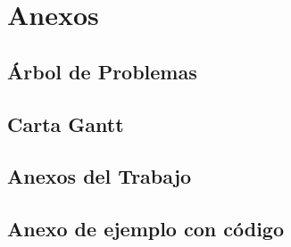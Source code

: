 \documentclass[letter,12pt]{report}
\begin{document}
\renewcommand{\appendixname}{Anexos}
\appendix
\chapter{Anexos}
\section{Árbol de Problemas}
\blindtext %
\section{Carta Gantt}
\blindtext %

\section{Anexos del Trabajo}
\blindtext %

\section{Anexo de ejemplo con código}
\end{document}
